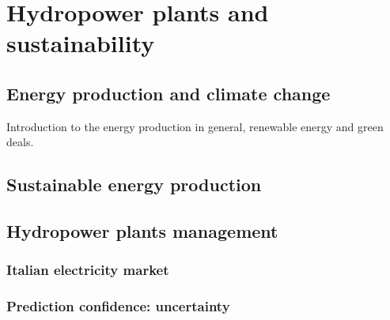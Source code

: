 
\chapter{Hydropower plants and sustainability}  %

\ifpdf
    \graphicspath{{Chapter1/Figs/Raster/}{Chapter1/Figs/PDF/}{Chapter1/Figs/}}
\else
    \graphicspath{{Chapter1/Figs/Vector/}{Chapter1/Figs/}}
\fi


\section{Energy production and climate change\label{section1.1}}

Introduction to the energy production in general, renewable energy and green deals.

\section{Sustainable energy production\label{section1.2}}


\section{Hydropower plants management\label{section1.3}}  

\subsection{Italian electricity market}

\subsection{Prediction confidence: uncertainty}

